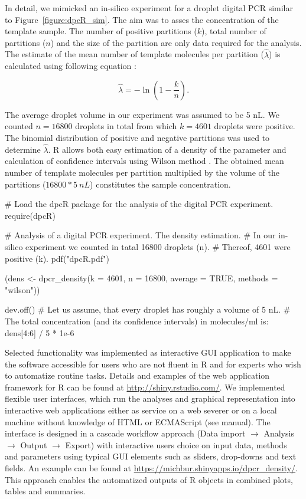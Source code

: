 In detail, we mimicked an in-silico experiment for a droplet digital PCR similar 
to Figure~\ref{figure:dpcR_sim}. The aim was to asses the concentration of the 
template sample. The number of positive partitions ($k$), total number of 
partitions ($n$) and the size of the partition are only data required for the 
analysis. The estimate of the mean number of template molecules per partition 
($\hat \lambda$) is calculated using following equation \citep{huggett_2013}:

\begin{equation}
\hat{\lambda} =  -\ln{(1 - \frac{k}{n})}.
\end{equation}

The average droplet volume in our experiment was assumed to be 5 nL. We counted 
$n = 16800$ droplets in total from which $k = 4601$ droplets were positive. The 
binomial distribution of positive and negative partitions was used to determine 
$\hat \lambda$. R allows both easy estimation of a density of the parameter and 
calculation of confidence intervals using Wilson method \citep{brown_2001}. The 
obtained mean number of template molecules per partition multiplied by the 
volume of the partitions ($ 16800 * 5~nL$) constitutes the sample concentration.

\begin{example}
# Load the dpcR package for the analysis of the digital PCR experiment.
require(dpcR)

# Analysis of a digital PCR experiment. The density estimation.
# In our in-silico experiment we counted in tatal 16800 droplets (n). 
# Thereof, 4601 were positive (k).
pdf("dpcR.pdf")

(dens <- dpcr_density(k = 4601, n = 16800, average = TRUE, methods = "wilson"))

dev.off()
# Let us assume, that every droplet has roughly a volume of 5 nL.
# The total concentration (and its confidence intervals) in molecules/ml is:
dens[4:6] / 5 * 1e-6
\end{example}

Selected functionality was implemented as interactive  GUI 
application to make the software accessible for users who are not fluent in R 
and for experts who wish to automatize routine tasks. Details and examples of 
the  web application framework for R can be found at 
\url{http://shiny.rstudio.com/}. We implemented flexible user 
interfaces, which run the analyses and graphical representation into interactive 
web applications either as service on a web severer or on a local machine 
without knowledge of HTML or ECMAScript (see  manual). The 
interface is designed in a cascade workflow approach (Data import $\rightarrow$ 
Analysis $\rightarrow$ Output $\rightarrow$ Export) with interactive users 
choice on input data, methods and parameters using typical GUI elements such as 
sliders, drop-downs and text fields. An example can be found at 
\url{https://michbur.shinyapps.io/dpcr_density/}. This approach enables the 
automatized outputs of R objects in combined plots, tables and summaries.

